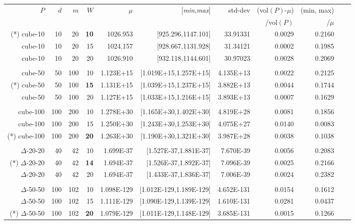 \documentclass[11pt,a4paper]{article}
\def\vol{\mbox{vol}}
\def\vol{\mbox{vol}}
\def\Min{{\it min}}
\def\Max{{\it max}}
\begin{document}
\begin{table}[t!]\centering\scriptsize
\begin{tabular*}{\linewidth}{@{\extracolsep{\fill}}rrrrrrrrrrr}
$P$ & $d$ & $m$ & $W$ & $\mu$ & [\Min,\Max] & std-dev & (\vol$(P)$-$\mu$) & 
(min, max) \\
&  &  & &  & &  & /\vol$(P)$ & /$\mu$ \\
\hline
(*) cube-10 & 10 & 20 & {\bf 10} & 1026.953 & [925.296,1147.101] & 33.91331 & 0.0029 & 0.2160\\
cube-10 & 10 & 20 & 15 & 1024.157 & [928.667,1131.928] & 31.34121 & 0.0002 & 0.1985\\
cube-10 & 10 & 20 & 20 & 1026.910 & [932.118,1144.601] & 30.97023 & 0.0028 & 0.2069\\
 &  &  &  &  &  &  &  & \\
cube-50 & 50 & 100 & 10 & 1.123E+15 & [1.019E+15,1.257E+15] & 4.135E+13 & 0.0022 & 0.2125\\
(*) cube-50 & 50 & 100 & {\bf 15} & 1.131E+15 & [1.039E+15,1.237E+15] & 3.882E+13 & 0.0044 & 0.1744\\
cube-50 & 50 & 100 & 20 & 1.127E+15 & [1.033E+15,1.216E+15] & 3.893E+13 & 0.0007 & 0.1629\\
 &  &  &  &  &  &  &  & \\
cube-100 & 100 & 200 & 10 & 1.278E+30 & [1.165E+30,1.402E+30] & 4.819E+28 & 0.0081 & 0.1856\\
cube-100 & 100 & 200 & 15 & 1.250E+30 & [1.243E+30,1.253E+30] & 4.075E+27 & 0.0140 & 0.0083\\
(*) cube-100 & 100 & 200 & {\bf 20} & 1.263E+30 & [1.190E+30,1.321E+30] & 3.987E+28 & 0.0038 & 0.1038\\
 &  &  &  &  &  &  &  & \\
$\Delta$-20-20 & 40 & 42 & 10 & 1.699E-37 & [1.527E-37,1.881E-37] & 7.670E-39 & 0.0056 & 0.2083\\
(*) $\Delta$-20-20 & 40 & 42 & {\bf 14} & 1.694E-37 & [1.526E-37,1.892E-37] & 7.096E-39 & 0.0025 & 0.2166\\
$\Delta$-20-20 & 40 & 42 & 20 & 1.694E-37 & [1.433E-37,1.836E-37] & 7.006E-39 & 0.0024 & 0.2382\\
 &  &  &  &  &  &  &  & \\
$\Delta$-50-50 & 100 & 102 & 10 & 1.098E-129 & [1.012E-129,1.189E-129] & 4.652E-131 & 0.0154 & 0.1612\\
$\Delta$-50-50 & 100 & 102 & 15 & 1.111E-129 & [1.090E-129,1.139E-129] & 1.610E-131 & 0.0281 & 0.0437\\
(*) $\Delta$-50-50 & 100 & 102 & {\bf 20} & 1.079E-129 & [1.011E-129,1.148E-129] & 3.685E-131 & 0.0015 & 0.1266\\

\end{tabular*}
\end{table}
\end{document}
